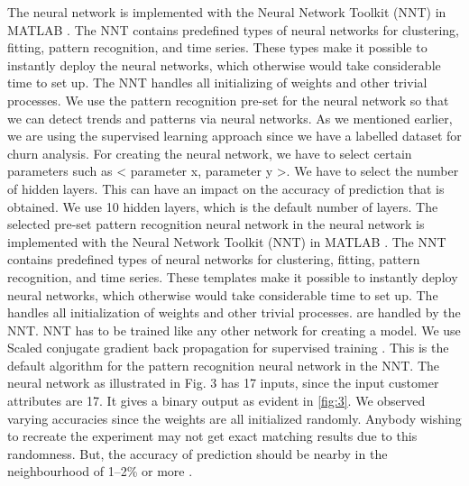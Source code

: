 \begin{itemize}
\begin{figure}[h!]
	\end{figure}
	
	The neural network is implemented with the Neural
	Network Toolkit (NNT) \cite{citation-11} in MATLAB \cite{citation-10}. The NNT
	contains predefined types of neural networks for clustering,
	fitting, pattern recognition, and time series. These types make
	it possible to instantly deploy the neural networks, which
	otherwise would take considerable time to set up. The NNT
	handles all initializing of weights and other trivial processes.
	We use the pattern recognition pre-set for the neural network
	so that we can detect trends and patterns via neural networks.
	As we mentioned earlier, we are using the supervised
	learning approach since we have a labelled dataset for churn
	analysis. For creating the neural network, we have to select
	certain parameters such as \textless{} parameter x, parameter y \textgreater{}. We
	have to select the number of hidden layers. This can have an
	impact on the accuracy of prediction that is obtained. We use
	10 hidden layers, which is the default number of layers.
	The selected pre-set pattern recognition neural network in
	the neural network is implemented with the Neural Network
	Toolkit (NNT) \cite{citation-11} in MATLAB \cite{citation-10}. The NNT contains
	predefined types of neural networks for clustering, fitting,
	pattern recognition, and time series. These templates make it
	possible to instantly deploy neural networks, which otherwise
	would take considerable time to set up. The \cite{citation-11} handles all
	initialization of weights and other trivial processes. are handled
	by the NNT\cite{citation-11}.
	NNT\cite{citation-11} has to be trained like any other network for creating
	a model. We use Scaled conjugate gradient back propagation
	for supervised training \cite{citation-6}. This is the default algorithm for
	the pattern recognition neural network in the NNT. The neural
	network as illustrated in Fig. 3 has 17 inputs, since the input
	customer attributes are 17. It gives a binary output as evident
	in \ref{fig:3}.
	We observed varying accuracies since the weights are
	all initialized randomly. Anybody wishing to recreate the
	experiment may not get exact matching results due to this
	randomness. But, the accuracy of prediction should be nearby
	in the neighbourhood of 1–2\% or more
	\cite{citation-8}.
	

\end{itemize}
